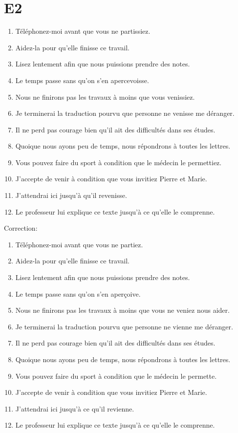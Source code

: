 \documentclass{book}
\begin{document}
    \section{E2}
        \begin{enumerate}
            \item Téléphonez-moi avant que vous ne partissiez.
            \item Aidez-la pour qu'elle finisse ce travail.
            \item Lisez lentement afin que nous puissions prendre des notes.
            \item Le temps passe sans qu'on s'en apercevoisse.
            \item Nous ne finirons pas les travaux à moins que vous venissiez.
            \item Je terminerai la traduction pourvu que personne ne venisse me déranger.
            \item Il ne perd pas courage bien qu'il ait des difficultés dans ses études.
            \item Quoique nous ayons peu de temps, nous répondrons à toutes les lettres.
            \item Vous pouvez faire du sport à condition que le médecin le permettiez.
            \item J'accepte de venir à condition que vous invitiez Pierre et Marie.
            \item J'attendrai ici jusqu'à qu'il revenisse.
            \item Le professeur lui explique ce texte jusqu'à ce qu'elle le comprenne.
        \end{enumerate}
        Correction:
        \begin{enumerate}
            \item Téléphonez-moi avant que vous ne partiez.
            \item Aidez-la pour qu'elle finisse ce travail.
            \item Lisez lentement afin que nous puissions prendre des notes.
            \item Le temps passe sans qu'on s'en aperçoive.
            \item Nous ne finirons pas les travaux à moins que vous ne veniez nous aider.
            \item Je terminerai la traduction pourvu que personne ne vienne me déranger.
            \item Il ne perd pas courage bien qu'il ait des difficultés dans ses études.
            \item Quoique nous ayons peu de temps, nous répondrons à toutes les lettres.
            \item Vous pouvez faire du sport à condition que le médecin le permette.
            \item J'accepte de venir à condition que vous invitiez Pierre et Marie.
            \item J'attendrai ici jusqu'à ce qu'il revienne.
            \item Le professeur lui explique ce texte jusqu'à ce qu'elle le comprenne.
        \end{enumerate}
\end{document}
